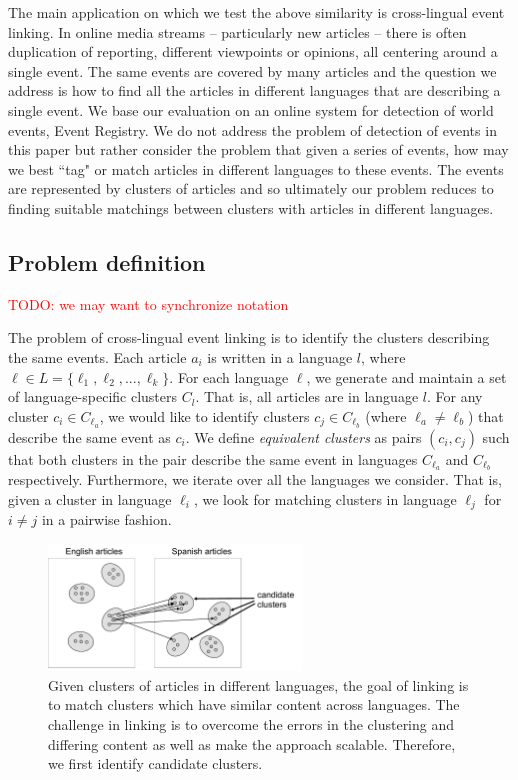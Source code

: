 \documentclass[twoside,11pt]{article}
\newcommand{\todo}[1]{\textcolor{red}{TODO: #1}}
\begin{document}
The main application on which we test the above similarity is cross-lingual event linking. In online media streams -- particularly new articles -- there is often duplication of reporting, different viewpoints or opinions, all centering around a single event. The same events are covered by many articles and the question we address is how to find all the articles in different languages that are describing a single event. We base our evaluation on an online system for detection of world events, Event Registry. We do not address the problem of detection of events in this paper but rather consider the problem that given a series of events, how may we best ``tag" or match articles in different languages to these events. The events are represented by clusters of articles and so ultimately our problem reduces to finding suitable matchings between clusters with articles in different languages.

\subsection{Problem definition}
\todo{we may want to synchronize notation}

The problem of cross-lingual event linking is to identify the clusters describing the same events. Each article $a_i$ is written in a language $l$, where $\ell \in L = \{\ell_1,\ell_2,...,\ell_k\}$. For each language $\ell$, we generate and maintain a set of language-specific clusters $C_l$. That is, all articles are in language $l$. For any cluster $c_i \in C_{\ell_a}$, we would like to identify clusters $c_j \in C_{\ell_b}$ (where $\ell_a \neq \ell_b$) that describe the same event as $c_i$. We define \emph{equivalent clusters} as  pairs $(c_i,c_j)$ such that both clusters in the pair describe the same event in languages $C_{\ell_a}$ and $C_{\ell_b}$ respectively. Furthermore, we iterate over all the languages we consider. That is, given a cluster in language $\ell_i$, we look for matching clusters in language $\ell_j$ for $i\neq j$  in a pairwise fashion.

\begin{figure}[tb]
\centering
\includegraphics[width=0.6\textwidth]{clusters}
\caption{\label{fig:clusters}  Given clusters of articles in different languages, the goal of  linking is to match clusters which have similar content across languages. The challenge in linking is to overcome the errors in the clustering and differing content as well as make the approach scalable. Therefore, we first identify candidate clusters. }
\end{figure}
\end{document}
